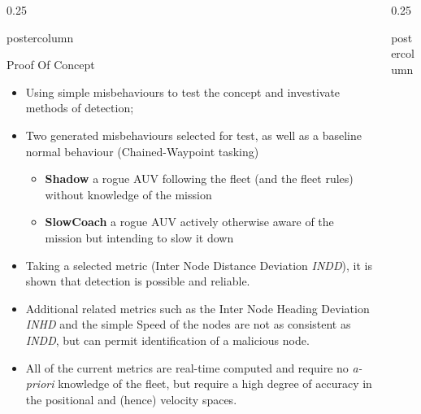 \documentclass[final,hyperref={pdfpagelabels=false}]{beamer}
\newlength{\columnheight}
\def\colwidth{0.25\linewidth}
\begin{document}
\begin{frame}[fragile]
\begin{columns}[t]
\begin{column}{\colwidth}
\begin{beamercolorbox}[center,wd=\textwidth]{postercolumn}
\begin{minipage}[T]{.98\textwidth}
{\begin{block}{Proof Of Concept}
              \begin{itemize}
                \item Using simple misbehaviours to test the concept and investivate methods of detection; 
                \item Two generated misbehaviours selected for test, as well as a baseline normal behaviour (Chained-Waypoint tasking)
                  \begin{itemize}
                    \item \textbf{Shadow} a rogue AUV following the fleet (and the fleet rules) without knowledge of the mission 
                    \item \textbf{SlowCoach} a rogue AUV actively otherwise aware of the mission but intending to slow it down
                  \end{itemize}
                \item Taking a selected metric (Inter Node Distance Deviation \emph{INDD}), it is shown that detection is possible and reliable.
                \item Additional related metrics such as the Inter Node Heading Deviation \emph{INHD} and the simple Speed of the nodes are not as consistent as \emph{INDD}, but can permit identification of a malicious node.
                \item All of the current metrics are real-time computed and require no \emph{a-priori} knowledge of the fleet, but require a high degree of 
                  accuracy in the positional and (hence) velocity spaces.
              \end{itemize}
            \end{block}   

          }
        \end{minipage}
      \end{beamercolorbox}
    \end{column}

    \begin{column}{\colwidth}
      \begin{beamercolorbox}[center,wd=\textwidth]{postercolumn}
        \begin{minipage}[T]{.98\textwidth} %
          \parbox[t][\columnheight]{\textwidth}{ %
 
}
\end{minipage}
\end{beamercolorbox}
\end{column}
\end{columns}
\end{frame}
\end{document}
